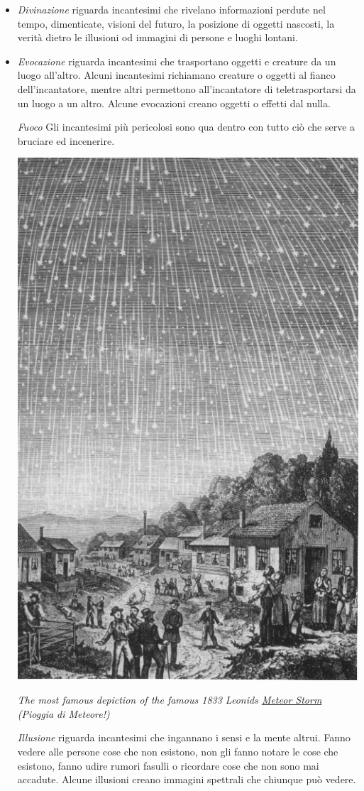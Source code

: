 \begin{multicols}{2}
\begin{itemize}[leftmargin=*]
\item
\emph{Divinazione} riguarda incantesimi che rivelano informazioni perdute nel tempo, dimenticate, visioni del futuro, la posizione di oggetti nascosti, la verità dietro le illusioni od immagini di persone e luoghi lontani.

\item
\emph{Evocazione} riguarda incantesimi che trasportano oggetti e creature da un luogo all'altro. Alcuni incantesimi richiamano creature o oggetti al fianco dell'incantatore, mentre altri permettono all'incantatore di teletrasportarsi da un luogo a un altro. Alcune evocazioni creano oggetti o effetti dal nulla.

\emph{Fuoco} Gli incantesimi più pericolosi sono qua dentro con tutto ciò che serve a bruciare ed incenerire.

\begin{center}
	\includegraphics[width=0.7\linewidth]{immagini/Leonids-1833.png}

	\emph{The most famous depiction of the famous 1833 Leonids \hyperlink{sciamedimeteore}{Meteor Storm} (Pioggia di Meteore!)}
\end{center}

\emph{Illusione} riguarda incantesimi che ingannano i sensi e la mente altrui. Fanno vedere alle persone cose che non esistono, non gli fanno notare le cose che esistono, fanno udire rumori fasulli o ricordare cose che non sono mai accadute. Alcune illusioni creano immagini spettrali che chiunque può vedere.


\end{itemize}
\end{multicols}
